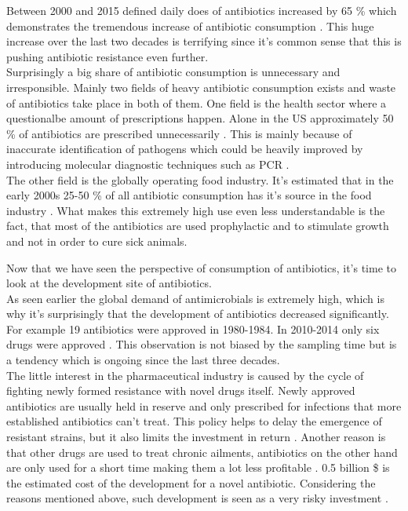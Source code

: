Between 2000 and 2015 defined daily does of antibiotics increased by 65 \% which demonstrates the tremendous increase of antibiotic consumption \cite{klein_reply_2018}.
This huge increase over the last two decades is terrifying since it's common sense that this is pushing antibiotic resistance even further.\\
Surprisingly a big share of antibiotic consumption is unnecessary and irresponsible. Mainly two fields of heavy antibiotic consumption exists and waste of antibiotics take place in both of them.
One field is the health sector where a questionalbe amount of prescriptions happen.
Alone in the US approximately 50 \% of antibiotics are prescribed unnecessarily \cite{sharma_antimicrobial_2011}. This is mainly because of inaccurate identification of pathogens which could be heavily improved by introducing molecular diagnostic techniques such as PCR \cite{ventola_antibiotic_2015}. \\
The other field is the globally operating food industry. It's estimated that in the early 2000s 25-50 \% of all antibiotic consumption has it's source in the food industry \cite{palumbi_humans_2001}. What makes this extremely high use even less understandable is the fact, that most of the antibiotics are used prophylactic and to stimulate growth and not in order to cure sick animals.

Now that we have seen the perspective of consumption of antibiotics, it's time to look at the development site of antibiotics.\\
As seen earlier the global demand of antimicrobials is extremely high, which is why it's surprisingly that the development of antibiotics decreased significantly. For example 19 antibiotics were approved in 1980-1984. In 2010-2014 only six drugs were approved \cite{ventola_antibiotic_2015}. This observation is not biased by the sampling time but is a tendency which is ongoing since the last three decades. \\
The little interest in the pharmaceutical industry is caused by the cycle of fighting newly formed resistance with novel drugs itself. Newly approved antibiotics are usually held in reserve and only prescribed for infections that more established antibiotics can't treat. This policy helps to delay the emergence of resistant strains, but it also limits the investment in return \cite{fair_antibiotics_2014}. Another reason is that other drugs  are used to treat chronic ailments, antibiotics on the other hand are only used for a short time making them a lot less profitable \cite{fair_antibiotics_2014}. 0.5 billion \$ \cite{costs} is the estimated cost of the development for a novel antibiotic. Considering the reasons mentioned above, such development is seen as a very risky investment \cite{fair_antibiotics_2014}.


